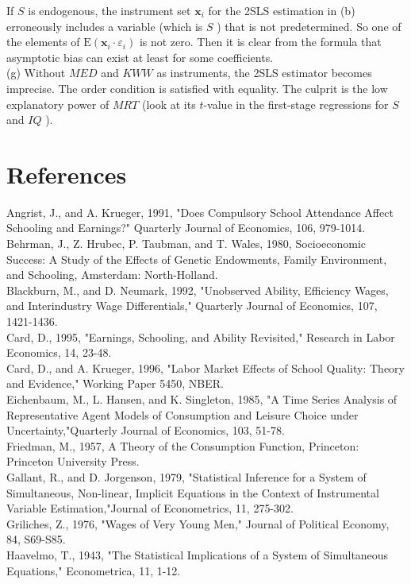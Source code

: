 \documentclass[10pt]{article}
\begin{document}
If $S$ is endogenous, the instrument set $\mathbf{x}_{i}$ for the 2SLS estimation in (b) erroneously includes a variable (which is $S$ ) that is not predetermined. So one of the elements of $\mathrm{E}\left(\mathbf{x}_{i} \cdot \varepsilon_{i}\right)$ is not zero. Then it is clear from the formula that asymptotic bias can exist at least for some coefficients.\\
(g) Without $M E D$ and $K W W$ as instruments, the 2SLS estimator becomes imprecise. The order condition is satisfied with equality. The culprit is the low explanatory power of $M R T$ (look at its $t$-value in the first-stage regressions for $S$ and $I Q$ ).

\section*{References}
Angrist, J., and A. Krueger, 1991, "Does Compulsory School Attendance Affect Schooling and Earnings?" Quarterly Journal of Economics, 106, 979-1014.\\
Behrman, J., Z. Hrubec, P. Taubman, and T. Wales, 1980, Socioeconomic Success: A Study of the Effects of Genetic Endowments, Family Environment, and Schooling, Amsterdam: North-Holland.\\
Blackburn, M., and D. Neumark, 1992, "Unobserved Ability, Efficiency Wages, and Interindustry Wage Differentials," Quarterly Journal of Economics, 107, 1421-1436.\\
Card, D., 1995, "Earnings, Schooling, and Ability Revisited," Research in Labor Economics, 14, 23-48.\\
Card, D., and A. Krueger, 1996, "Labor Market Effects of School Quality: Theory and Evidence," Working Paper 5450, NBER.\\
Eichenbaum, M., L. Hansen, and K. Singleton, 1985, "A Time Series Analysis of Representative Agent Models of Consumption and Leisure Choice under Uncertainty,"Quarterly Journal of Economics, 103, 51-78.\\
Friedman, M., 1957, A Theory of the Consumption Function, Princeton: Princeton University Press.\\
Gallant, R., and D. Jorgenson, 1979, "Statistical Inference for a System of Simultaneous, Non-linear, Implicit Equations in the Context of Instrumental Variable Estimation,"Journal of Econometrics, 11, 275-302.\\
Griliches, Z., 1976, "Wages of Very Young Men," Journal of Political Economy, 84, S69-S85.\\
Haavelmo, T., 1943, "The Statistical Implications of a System of Simultaneous Equations," Econometrica, 11, 1-12.\\
\end{document}
